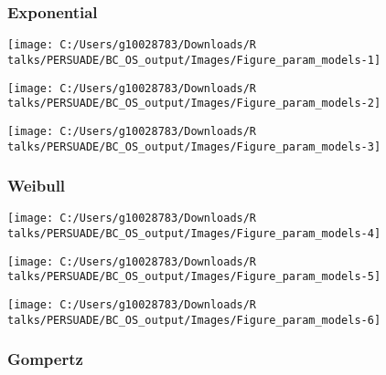 \documentclass[
]{article}
\begin{document}
\clearpage

\clearpage

\subsubsection{Exponential}\label{exponential}

\begin{flushleft}\texttt{[image: C:/Users/g10028783/Downloads/R talks/PERSUADE/BC\_OS\_output/Images/Figure\_param\_models-1]} \end{flushleft}

\begin{flushleft}\texttt{[image: C:/Users/g10028783/Downloads/R talks/PERSUADE/BC\_OS\_output/Images/Figure\_param\_models-2]} \end{flushleft}

\begin{flushleft}\texttt{[image: C:/Users/g10028783/Downloads/R talks/PERSUADE/BC\_OS\_output/Images/Figure\_param\_models-3]} \end{flushleft}

\clearpage

\subsubsection{Weibull}\label{weibull}

\begin{flushleft}\texttt{[image: C:/Users/g10028783/Downloads/R talks/PERSUADE/BC\_OS\_output/Images/Figure\_param\_models-4]} \end{flushleft}

\begin{flushleft}\texttt{[image: C:/Users/g10028783/Downloads/R talks/PERSUADE/BC\_OS\_output/Images/Figure\_param\_models-5]} \end{flushleft}

\begin{flushleft}\texttt{[image: C:/Users/g10028783/Downloads/R talks/PERSUADE/BC\_OS\_output/Images/Figure\_param\_models-6]} \end{flushleft}

\clearpage

\subsubsection{Gompertz}\label{gompertz}
\end{document}
